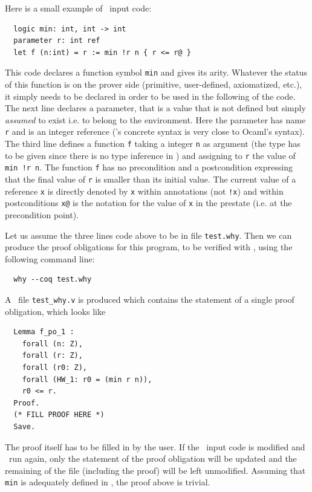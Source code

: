 \documentclass[a4paper,12pt]{report}
\begin{document}
Here is a small example of \why\ input code:
\begin{verbatim}
  logic min: int, int -> int
  parameter r: int ref
  let f (n:int) = r := min !r n { r <= r@ }
\end{verbatim}
This code declares a function symbol \texttt{min} and gives its
arity. Whatever the status of this function is on the prover side
(primitive, user-defined, axiomatized, etc.), it simply needs to be
declared in order to be used in the following of the code. The next
line declares a parameter, that is a value that is not defined but
simply \emph{assumed} to exist i.e. to belong to the environment. Here
the parameter has name \texttt{r} and is an integer reference (\why's
concrete syntax is very close to Ocaml's syntax). The third line
defines a function \texttt{f} taking a integer \texttt{n} as argument
(the type has to be given since there is no type inference in \why)
and assigning to \texttt{r} the value of \texttt{min !r n}.
The function \texttt{f} has no precondition and a postcondition
expressing that the final value of \texttt{r} is smaller than its
initial value. The current value of a reference \texttt{x} is directly
denoted by \texttt{x} within annotations (not \texttt{!x}) and within
postconditions \texttt{x@} is the notation for the value of \texttt{x}
in the prestate (i.e. at the precondition point).

Let us assume the three lines code above to be in file
\texttt{test.why}. Then we can produce the proof obligations for this
program, to be verified with \coq, using the following command line:
\begin{verbatim}
  why --coq test.why
\end{verbatim}
A \coq\ file \texttt{test\_why.v} is produced which contains the
statement of a single proof obligation, which looks like
\begin{verbatim}
  Lemma f_po_1 : 
    forall (n: Z),
    forall (r: Z),
    forall (r0: Z),
    forall (HW_1: r0 = (min r n)),
    r0 <= r.
  Proof.
  (* FILL PROOF HERE *)
  Save.
\end{verbatim}
The proof itself has to be filled in by the user. If the \why\ input
code is modified and \why\ run again, only the statement of the proof
obligation will be updated and the remaining of the file (including
the proof) will be left unmodified.
Assuming that \texttt{min} is adequately defined in \coq, the proof
above is trivial.
\end{document}
